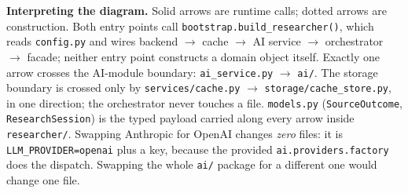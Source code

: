 \documentclass[11pt,a4paper]{article}
\begin{document}
\textbf{Interpreting the diagram.} Solid arrows are runtime calls; dotted arrows are construction. Both entry points call \texttt{bootstrap.build\_researcher()}, which reads \texttt{config.py} and wires backend $\to$ cache $\to$ AI service $\to$ orchestrator $\to$ facade; neither entry point constructs a domain object itself. Exactly one arrow crosses the AI-module boundary: \texttt{ai\_service.py} $\to$ \texttt{ai/}. The storage boundary is crossed only by \texttt{services/cache.py} $\to$ \texttt{storage/cache\_store.py}, in one direction; the orchestrator never touches a file. \texttt{models.py} (\texttt{SourceOutcome}, \texttt{ResearchSession}) is the typed payload carried along every arrow inside \texttt{researcher/}. Swapping Anthropic for OpenAI changes \emph{zero} files: it is \texttt{LLM\_PROVIDER=openai} plus a key, because the provided \texttt{ai.providers.factory} does the dispatch. Swapping the whole \texttt{ai/} package for a different one would change one file.
\end{document}
